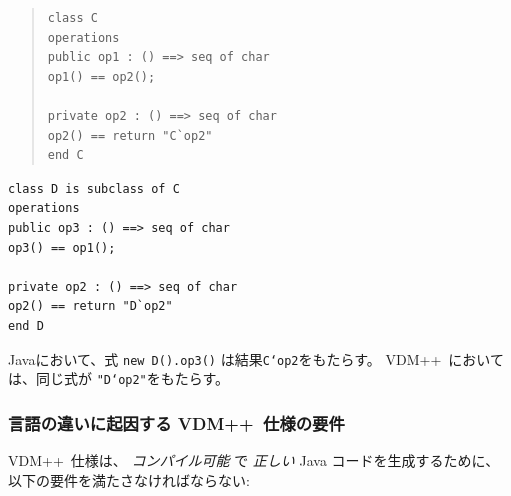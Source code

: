 \documentclass[\pformat,11pt]{jarticle}
\newcommand{\VDM}{VDM++}
\begin{document}
\begin{minipage}{.55\textwidth}
\begin{quote}
\begin{verbatim}
class C
operations
public op1 : () ==> seq of char
op1() == op2();

private op2 : () ==> seq of char
op2() == return "C`op2"
end C
\end{verbatim}
\end{quote}
\end{minipage}
\begin{minipage}{.45\textwidth}
\begin{verbatim}
class D is subclass of C
operations
public op3 : () ==> seq of char
op3() == op1();

private op2 : () ==> seq of char
op2() == return "D`op2"
end D
\end{verbatim}
\end{minipage}

 Javaにおいて、式 \texttt{new D().op3()} は結果\texttt{C`op2}をもたらす。
 \VDM\ においては、同じ式が \texttt{"D`op2"}をもたらす。

\subsubsection{言語の違いに起因する \VDM\ 仕様の要件}
\label{lim1}

 \VDM\ 仕様は、 {\em コンパイル可能} で {\em 正しい} Java コードを生成するために、以下の要件を満たさなければならない:
\end{document}
